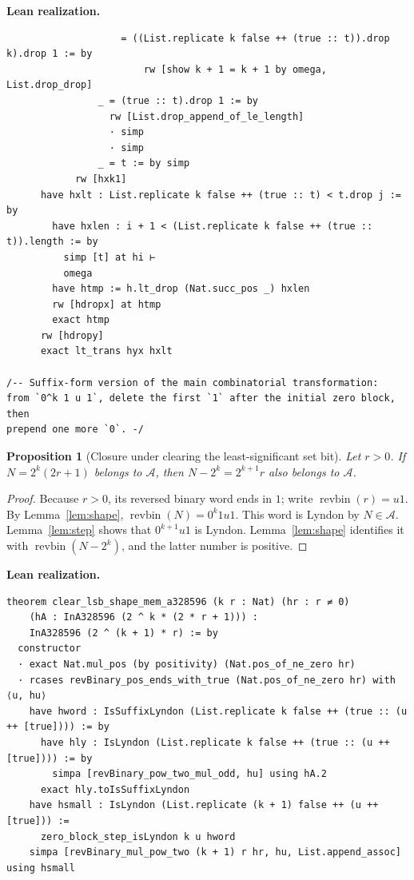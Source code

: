 \documentclass[11pt]{article}
\newtheorem{proposition}[theorem]{Proposition}
\theoremstyle{definition}
\theoremstyle{remark}
\newenvironment{leanbridge}{%
  \par\smallskip\noindent\textbf{Lean realization.}\par\smallskip%
}{%
  \par\smallskip%
}
\newcommand{\SeqA}{\mathcal{A}}
\newcommand{\revbin}{\operatorname{revbin}}
\begin{document}
\begin{leanbridge}
\begin{lstlisting}
                    = ((List.replicate k false ++ (true :: t)).drop k).drop 1 := by
                        rw [show k + 1 = k + 1 by omega, List.drop_drop]
                _ = (true :: t).drop 1 := by
                  rw [List.drop_append_of_le_length]
                  · simp
                  · simp
                _ = t := by simp
            rw [hxk1]
      have hxlt : List.replicate k false ++ (true :: t) < t.drop j := by
        have hxlen : i + 1 < (List.replicate k false ++ (true :: t)).length := by
          simp [t] at hi ⊢
          omega
        have htmp := h.lt_drop (Nat.succ_pos _) hxlen
        rw [hdropx] at htmp
        exact htmp
      rw [hdropy]
      exact lt_trans hyx hxlt

/-- Suffix-form version of the main combinatorial transformation:
from `0^k 1 u 1`, delete the first `1` after the initial zero block, then
prepend one more `0`. -/
\end{lstlisting}
\end{leanbridge}

\begin{proposition}[Closure under clearing the least-significant set bit]
\label{prop:clear}
Let $r>0$.  If $N=2^k(2r+1)$ belongs to $\SeqA$, then
$N-2^k=2^{k+1}r$ also belongs to $\SeqA$.
\end{proposition}
\begin{proof}
Because $r>0$, its reversed binary word ends in $1$; write
$\revbin(r)=u1$.  By Lemma~\ref{lem:shape},
$\revbin(N)=0^k1u1$.  This word is Lyndon by $N\in\SeqA$.
Lemma~\ref{lem:step} shows that $0^{k+1}u1$ is Lyndon.  Lemma~\ref{lem:shape}
identifies it with $\revbin(N-2^k)$, and the latter number is positive.
\end{proof}
\begin{leanbridge}
\begin{lstlisting}
theorem clear_lsb_shape_mem_a328596 (k r : Nat) (hr : r ≠ 0)
    (hA : InA328596 (2 ^ k * (2 * r + 1))) :
    InA328596 (2 ^ (k + 1) * r) := by
  constructor
  · exact Nat.mul_pos (by positivity) (Nat.pos_of_ne_zero hr)
  · rcases revBinary_pos_ends_with_true (Nat.pos_of_ne_zero hr) with ⟨u, hu⟩
    have hword : IsSuffixLyndon (List.replicate k false ++ (true :: (u ++ [true]))) := by
      have hly : IsLyndon (List.replicate k false ++ (true :: (u ++ [true]))) := by
        simpa [revBinary_pow_two_mul_odd, hu] using hA.2
      exact hly.toIsSuffixLyndon
    have hsmall : IsLyndon (List.replicate (k + 1) false ++ (u ++ [true])) :=
      zero_block_step_isLyndon k u hword
    simpa [revBinary_mul_pow_two (k + 1) r hr, hu, List.append_assoc] using hsmall
\end{lstlisting}
\end{leanbridge}
\end{document}
